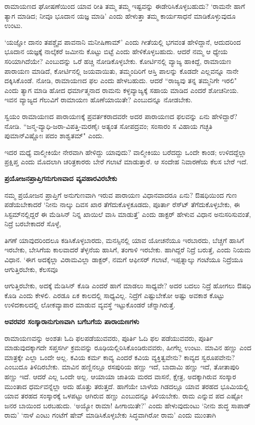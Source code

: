 ರಾಮಾಯಣದ ಘೋಷಣೆಯಿಂದ ಯಾವ ರೀತಿ ತಮ್ಮ ತಮ್ಮ ಇಷ್ಟವನ್ನು ಈಡೇರಿಸಿಕೊಳ್ಳಬಹುದು? `ರಾಮನೇ ಹಾಗೆ ತ್ಯಾಗ ಮಾಡಿದ; ನೀವೂ ಭೂದಾನ ಯಜ್ಞ ಮಾಡಿ' ಎಂದು ಹೇಳುತ್ತಾ ತಮ್ಮ ಕಾರ್ಯಸಾಧನೆ ಮಾಡಿಕೊಳ್ಳುವುದೂ ಉಂಟು. 


`ಯಜ್ಞೋ ದಾನಂ ತಪಶ್ಚೈವ ಪಾವನಾನಿ ಮನೀಷಿಣಾಮ್‍' ಎಂದು ಗೀತೆಯಲ್ಲಿ ಭಗವಂತ ಹೇಳಿದ್ದಾನೆ, ಆದುದರಿಂದ ಭೂದಾನ ಯಜ್ಞಕ್ಕೆ ನಾಲ್ಕೆಕರೆ ಜಮೀನು ಕೊಟ್ಟು ಬಿಟ್ಟೆ ಎಂದು ಹೇಳಿಕೊಳ್ಳಬಹುದು. ಆದರೆ ನಮ್ಮ ಆ ಧ್ಯೇಯ ಸರಿಯಾಗಿದೆಯೇ? ಎಂಬುದನ್ನು ಒರೆ ಹಚ್ಚಿ ನೋಡಿಕೊಳ್ಳಬೇಕು. ಕೋರ್ಟಿನಲ್ಲಿ ವ್ಯಾಜ್ಯ ಹಾಕಿದ್ದೆ, ರಾಮಾಯಣ ಪಾರಾಯಣ ಮಾಡಿದೆ, ಕೋರ್ಟಿನಲ್ಲಿ ಜಯವಾಯಿತು, ತಮ್ಮಂದಿರಿಗೆ ಆಸ್ತಿ ಪಾಲನ್ನು ಕೊಡದೇ ಎಲ್ಲವನ್ನೂ ನಾನೇ ದಕ್ಕಿಸಿಕೊಂಡೆ. ನೋಡಿ, ರಾಮಾಯಣದ ಫಲ ಎಂದು ಹೇಳಬಹುದು. ಆದರೆ ``ರಾಜ್ಯವು ತನ್ನ ತಮ್ಮನಿಗೇ ಇರಲಿ" ಎಂದು ತ್ಯಾಗ ಮಾಡಿ ಹೋದ ಧರ್ಮಾತ್ಮನಾದ ರಾಮನು ಕಳ್ಳವ್ಯಾಜ್ಯಕ್ಕೆ ಸಹಾಯ ಮಾಡಿದ ಎಂದರೆ ಶೋಚನೀಯ. ಇವನ ವ್ಯಾಜ್ಯದ ಗೆಲುವಿಗೆ ರಾಮಾಯಣ ಹೊಣೆಯಾಯಿತೇ? ಎಂಬುದನ್ನೂ ನೋಡಬೇಕು. 


ಸ್ವಯಂ ರಾಮಾಯಣದ ಪಾರಾಯಣಕ್ಕೆ ಪ್ರವರ್ತಕರಾದವರೇ ಅದರ ಪಾರಾಯಣದ ಫಲವನ್ನು ಏನು ಹೇಳಿದ್ದಾರೆ? ನೋಡಿ. ``ಜನ್ಮ-ವ್ಯಾಧಿ-ಜರಾ-ವಿಪತ್ತಿ-ಮರಣೈಃ ಅತ್ಯಂತ ಸೋಪದ್ರವಂ; ಸಂಸಾರಂ ಸ ವಿಹಾಯ ಗಚ್ಛತಿ ಪುಮಾನ್‍ವಿಷ್ಣೋಃ ಪದಂ ಶಾಶ್ವತಮ್‍" ಎಂದು. 


ಇದರ ಮಧ್ಯೆ ವಾಲ್ಮೀಕಿಯೇ ನೇರವಾಗಿ ಹೇಳಿದ್ದು ಯಾವುದು? ವಾಲ್ಮೀಕಿಯು ಬರೆದದ್ದು ಒಂದೇ ಕಾಂಡ; ಉಳಿದದ್ದೆಲ್ಲಾ ಪ್ರಕ್ಷಿಪ್ತ ಎಂದು ಮೊದಲಾಗಿ ಚರಿತ್ರಕಾರರು ಬೇರೆ ಗಲಾಟೆ ಮಾಡುತ್ತಾರೆ. ಆ ಸಂದೇಹ ನಿವಾರಣೆಯ ಕೆಲಸ ಬೇರೆ ಇದೆ. 


{\bf ಪ್ರಯೋಜನಪ್ರಾಪ್ತಿಗನುಗುಣವಾದ ವ್ಯವಹಾರವಿರಬೇಕು} 


ನಮ್ಮ ಪ್ರಯೋಜನ ಪ್ರಾಪ್ತಿಗೆ ಅನುಗುಣವಾಗಿ ಇರುವ ಪಾರಾಯಣ ವಿಧಾನವಾದರೂ ಏನು? ಔಷಧಿಯಿಂದ ಗುಣ ಪಡೆಯಬೇಕಾದರೆ `ನೀನು ನಾಲ್ಕು ದಿವಸ ಖಾರ ತೆಗೆದುಕೊಳ್ಳಕೂಡದು, ಪೂರ್ತಾ ರೆಸ್ಟ್‍ ತೆಗೆದುಕೊಳ್ಳಬೇಕು, ಈ ಸಿಸ್ಟಮ್‍ನಲ್ಲಿದ್ದರೆ ಈ ಮೆಡಿಸಿನ್‍ ನಿನ್ನ ಖಾಯಿಲೆ ವಾಸಿ ಮಾಡುತ್ತೆ' ಎಂದು ಡಾಕ್ಟರ್‍ ಹೇಳುವ ವಿಧಾನ ಅನುಸರಿಸುವಂತೆ, ನಿದ್ರೆ ಬರಬೇಕಾದರೆ ಸೊಳ್ಳೆ, 

ತಿಗಣೆ ಯಾವುದರಿಂದಲೂ ಕಡಿಸಿಕೊಳ್ಳಬಾರದು, ಮನಸ್ಸಿನಲ್ಲಿ ಯಾವ ಯೋಚನೆಯೂ ಇರಬಾರದು, ಬೆಚ್ಚಗೆ ಹಾಸಿಗೆ ಇರಬೇಕು, ಬೇಸಿಗೆಯ ಕಾಲವಾದರೆ ತೆಳ್ಳನೆಯ ಹಾಸಿಗೆ, ತಂಗಾಳಿ ಇರಬೇಕು. ಹಾಗಿದ್ದರೆ ನಿದ್ರೆ ಬರುತ್ತೆ, ಎಂದು ನಿಯಮ ವಿಧಾನ. `ಈಗ ಅದಕ್ಕೆಲ್ಲಾ ವಿರಾಮವಿಲ್ಲಾ ಡಾಕ್ಟರ್‍, ನಮಗೆ ಆಫೀಸರ್‍ ಗಲಾಟೆ, ಇಪ್ಪತ್ನಾಲ್ಕು ಗಂಟೆಯೂ ನಿದ್ರೆಯೂ ಆಗುತ್ತಿರಬೇಕು, ಕೆಲಸವೂ 

ಆಗುತ್ತಿರಬೇಕು, ಅದಕ್ಕೆ ಮೆಡಿಸಿನ್‍ ಕೊಡಿ ಎಂದರೆ ಹಾಗೆ ಮಾಡಲು ಸಾಧ್ಯವೇ? ಅದರ ಬದಲು ನಿದ್ರೆ ಹೋಗಲು ಔಷಧಿ ಕೊಡಿ ಎಂದು ಕೇಳಲಿ. ಎರಡೂ ಏಕ ಕಾಲದಲ್ಲಿ ಸಾಧ್ಯವಿಲ್ಲ. ನಿದ್ರೆಗೆ ಎಷ್ಟುಬೇಕೋ ಅಷ್ಟು ಅವಕಾಶ ಕೊಟ್ಟು ಉಳಿದಕಾಲದಲ್ಲಿ ಲೋಕವ್ಯಾಪಾರ ಮಾಡುವ ವ್ಯವಸ್ಥೆ ಇಟ್ಟುಕೊಂಡರೆ ಚೆನ್ನಾಗಿರುತ್ತೆ. 


{\bf ಅವರವರ ಸಂಸ್ಕಾರಾನುಗುಣವಾಗಿ ಬಗೆಬಗೆಯ ಪಾರಾಯಣಗಳು} 


ರಾಮಾಯಣವನ್ನು ಅಂಶತಃ ಓದಿ ಫಲಪಡೆಯುವವರು, ಪೂರ್ತಿ ಓದಿ ಫಲ ಪಡೆಯುವವರು, ಪೂರ್ತಿ ಮಾಡುವುದಕ್ಕಾಗದೇ ಸಪ್ತಸರ್ಗಿ ಕ್ರಮವನ್ನು ರೂಢಿಯಲ್ಲಿರಿಸಿಕೊಂಡಿರುವವರು, ಹೀಗೆಲ್ಲ ಉಂಟು. ಮಾವಿನ ಹಣ್ಣು ಎಂದ ಮಾತ್ರಕ್ಕೇ ಎಲ್ಲಾ ಒಂದೇ ಅಲ್ಲ. ಕವಿಯ ಕರ್ಮ ಕಾವ್ಯ ಎಂದರೆ ಕವಿಯ ವ್ಯಕ್ತಿತ್ವವೇನು? ಕಾವ್ಯದ ಸ್ವರೂಪವೇನು? ಎಂಬುದೂ ತಿಳಿದಿರಬೇಕು. ಮಾವಿನ ಹಣ್ಣಿನಲ್ಲೂ ರಸಪುರಿಯ ಹಣ್ಣು ಇದೆ, ಬಾದಾಮಿ ಹಣ್ಣು ಇದೆ, ತೋತಾಪುರಿ ಹಣ್ಣು ಇದೆ. ಆದರೆ ಎಲ್ಲ ಒಂದೇ ಅಲ್ಲ. ಆಯಾಯಾ ಜಾತಿಯ ಮರದ ವಾಸನೆ, ಕ್ಷೇತ್ರ, ಅದಕ್ಕಾಗಿರುವ ಸಂಸ್ಕಾರ ಮುಂತಾದ ಧರ್ಮವನ್ನೆಲ್ಲಾ ಅದು ಹೊತ್ತು ತರುತ್ತದೆ. ಹಾಗೆಯೇ ಬಾಳೆಯ ಗಿಡದಲ್ಲೂ ಯಾವ ತರಹದ ಭೂಮಿಯಲ್ಲಿ ಯಾವ ತರಹದ ಸಂಸ್ಕಾರಕ್ಕೆ ಒಳಪಟ್ಟು ಆಗಿರುವ ಹಣ್ಣು ಎಂಬುದನ್ನೂ ತಿಳಿಯಬೇಕು. ರಾಮ ಎನ್ನುವ ಪದ ಎಷ್ಟೋ ಜನರ ಬಾಯಿಂದ ಬರಬಹುದು. `ಅಯ್ಯೋ ರಾಮಾ! ಹೀಗಾಯಿತೇ?' ಎಂದು ಹೇಳುವುದುಂಟು `ನೀನು ಶುದ್ಧ ಸಾಪಾಡ್‍ ರಾಮ' `ನಾಳೆ ಎಂಟು ಗಂಟೆಗೆ ಷೇವ್‍ ಮಾಡಿಸಿಕೊಳ್ಳಬೇಕು ಸಿದ್ಧವಾಗಿರೋ ರಾಮ' ಎಂದು ಮುಂತಾಗಿ 

